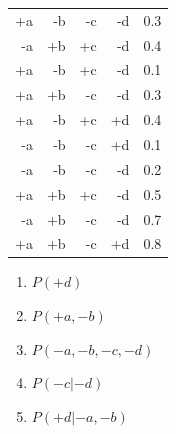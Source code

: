 \documentclass[12pt]{article}
\begin{document}
\begin{enumerate}
\begin{flushleft}
\begin{tabular}{rrrrr} 
+a & -b & -c & -d & 0.3 \\
-a & +b & +c & -d & 0.4 \\
+a & -b & +c & -d & 0.1 \\
+a & +b & -c & -d & 0.3 \\
+a & -b & +c & +d & 0.4 \\
-a & -b & -c & +d & 0.1 \\
-a & -b & -c & -d & 0.2 \\
+a & +b & +c & -d & 0.5 \\
-a & +b & -c & -d & 0.7 \\
+a & +b & -c & +d & 0.8 \\
\end{tabular}
\end{flushleft}

\begin{enumerate}

  \item $P(+d)$

  \item $P(+a,-b)$

  \item $P(-a,-b,-c,-d)$

  \item $P(-c | -d)$

  \item $P(+d | -a, -b)$

\end{enumerate}

\end{enumerate}
\end{document}

